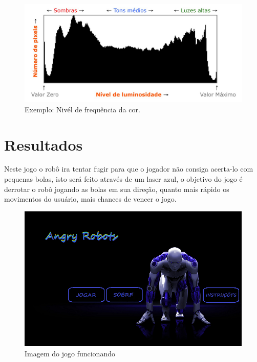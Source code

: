 \documentclass[12pt,openright,twoside,a4paper,brazil]{abntex2}
\begin{document}
\begin{figure}[!htb]
\centering
\includegraphics[scale=0.2]{histograma.jpg}
\caption{Exemplo: Nivél de frequência da cor.}
\end{figure}

\section*{Resultados}

Neste jogo o robô ira tentar fugir para que o jogador não consiga acerta-lo com pequenas bolas, 
isto será feito através de um laser azul, o objetivo do jogo é derrotar o robô jogando as bolas em sua direção, quanto mais rápido os movimentos do usuário, mais chances de vencer o jogo.

\begin{figure}[!htb]
\centering
\includegraphics[scale=0.2]{menu.png}
\caption{Imagem do jogo funcionando}
\end{figure}
\vspace{0.5cm}

\break
\end{document}
